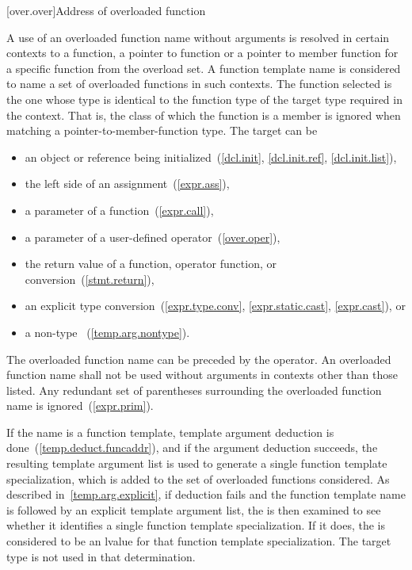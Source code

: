 %

[over.over]{Address of overloaded function}%
%

\pnum
A use of an overloaded function name without arguments is resolved
in certain contexts to a function, a pointer to function or a pointer to
member function for a specific function from the overload set.
A function template name is considered to name a set of overloaded functions
in such contexts.
The function selected is the one whose type is identical to the
function type of the
target type required in the context.
\enternote
That is, the class of which the function is a member is ignored when matching a
pointer-to-member-function type.
\exitnote
The target can be

\begin{itemize}
\item
an object or reference being initialized~(\ref{dcl.init}, \ref{dcl.init.ref},
\ref{dcl.init.list}),
\item
the left side of an assignment~(\ref{expr.ass}),
\item
a parameter of a function~(\ref{expr.call}),
\item
a parameter of a user-defined operator~(\ref{over.oper}),
\item
the return value of a function, operator function, or conversion~(\ref{stmt.return}),
\item
an explicit type conversion~(\ref{expr.type.conv}, \ref{expr.static.cast},
\ref{expr.cast}), or
\item
a non-type
~(\ref{temp.arg.nontype}).
\end{itemize}

The overloaded function name can be preceded by the
\tcode{\&}
operator.
An overloaded function name shall not be used without arguments in contexts
other than those listed.
\enternote
Any redundant set of parentheses surrounding the overloaded function name is
ignored~(\ref{expr.prim}).
\exitnote

\pnum
If the name is a function template, template argument deduction is
done~(\ref{temp.deduct.funcaddr}), and if the argument deduction succeeds,
the
resulting template argument list is
used to generate a single
function template specialization,
which is added to the set of overloaded functions
considered.
\enternote
As described in~\ref{temp.arg.explicit}, if deduction fails and the
function template name is followed by an explicit template argument list,
the
is then examined to see whether it identifies a single function template
specialization. If it does, the
is considered to be an lvalue for that function template specialization.
The target type is not used in that determination.
\exitnote

